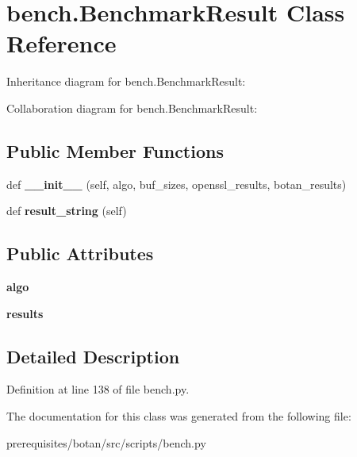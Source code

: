 \hypertarget{classbench_1_1_benchmark_result}{}\section{bench.\+Benchmark\+Result Class Reference}
\label{classbench_1_1_benchmark_result}


Inheritance diagram for bench.\+Benchmark\+Result\+:


Collaboration diagram for bench.\+Benchmark\+Result\+:
\subsection*{Public Member Functions}
\begin{DoxyCompactItemize}
\item 
\mbox{\label{classbench_1_1_benchmark_result_a57a0b40ce4d8e6269a10c1de8c239b9c}} 
def {\bfseries \+\_\+\+\_\+init\+\_\+\+\_\+} (self, algo, buf\+\_\+sizes, openssl\+\_\+results, botan\+\_\+results)
\item 
\mbox{\label{classbench_1_1_benchmark_result_a28b3d3f1e7ffac843820bc81df70d92f}} 
def {\bfseries result\+\_\+string} (self)
\end{DoxyCompactItemize}
\subsection*{Public Attributes}
\begin{DoxyCompactItemize}
\item 
\mbox{\label{classbench_1_1_benchmark_result_ab2562448f96d1ba9e3a3dcc86e32e518}} 
{\bfseries algo}
\item 
\mbox{\label{classbench_1_1_benchmark_result_a029af897c43b2fe8009f5470e8ad05f1}} 
{\bfseries results}
\end{DoxyCompactItemize}


\subsection{Detailed Description}


Definition at line 138 of file bench.\+py.



The documentation for this class was generated from the following file\+:\begin{DoxyCompactItemize}
\item 
prerequisites/botan/src/scripts/bench.\+py\end{DoxyCompactItemize}

